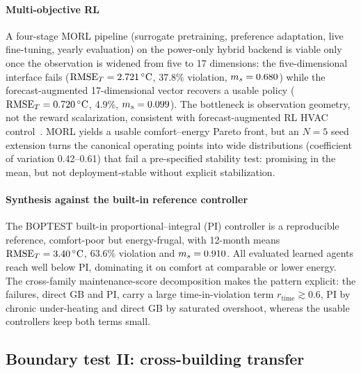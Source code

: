 \paragraph{Multi-objective RL}
A four-stage MORL pipeline (surrogate pretraining, preference adaptation, live fine-tuning, yearly
evaluation) on the power-only hybrid backend is viable only once the observation is widened from
five to 17 dimensions: the five-dimensional interface fails
($\mathrm{RMSE}_T=\SI{2.721}{\celsius}$, 37.8\% violation, $m_s=0.680$) while the forecast-augmented
17-dimensional vector recovers a usable policy ($\mathrm{RMSE}_T=\SI{0.720}{\celsius}$, 4.9\%,
$m_s=0.099$). The bottleneck is observation geometry, not the reward scalarization, consistent with
forecast-augmented RL HVAC control~\cite{Gao2024Predictive}. MORL yields a usable comfort--energy
Pareto front, but an $N=5$ seed extension turns the canonical operating points into wide
distributions (coefficient of variation 0.42--0.61) that fail a pre-specified stability test:
promising in the mean, but not deployment-stable without explicit stabilization.

\paragraph{Synthesis against the built-in reference controller}
The BOPTEST built-in proportional--integral (PI) controller is a reproducible reference, comfort-poor but energy-frugal, with
12-month means $\mathrm{RMSE}_T=\SI{3.40}{\celsius}$, 63.6\% violation and $m_s=0.910$. All evaluated
learned agents reach \ms{} well below PI, dominating it on comfort at comparable or lower energy.
The cross-family maintenance-score decomposition makes the pattern explicit: the failures, direct GB
and PI, carry a large time-in-violation term $r_{\mathrm{time}}\gtrsim0.6$, PI by chronic
under-heating and direct GB by saturated overshoot, whereas the usable controllers keep both terms
small.

\subsection{Boundary test II: cross-building transfer}\label{sec:transfer}

